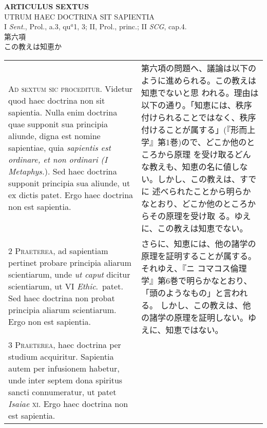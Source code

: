 \documentclass[10pt]{jsarticle}
\begin{document}
\begin{center}
 {\Large {\bf ARTICULUS SEXTUS}}\\
 {\large UTRUM HAEC DOCTRINA SIT SAPIENTIA}\\
 {\footnotesize I {\itshape Sent.}, Prol., a.3, qu$^a$1, 3; II, Prol.,
 princ.; II {\itshape SCG}, cap.4.}\\
 {\Large 第六項\\この教えは知恵か}
\end{center}

\begin{longtable}{p{21em}p{21em}}



{\Huge A}{\scshape d sextum sic proceditur}. Videtur quod haec
doctrina non sit sapientia. Nulla enim doctrina quae supponit sua
principia aliunde, digna est nomine sapientiae, quia {\itshape
sapientis est ordinare, et non ordinari (I Metaphys.}). Sed haec
doctrina supponit principia sua aliunde, ut ex dictis patet. Ergo haec
doctrina non est sapientia.


&

第六項の問題へ、議論は以下のように進められる。この教えは知恵でないと思
われる。理由は以下の通り。「知恵には、秩序付けられることではなく、秩序
付けることが属する」(『形而上学』第1巻)ので、どこか他のところから原理
を受け取るどんな教えも、知恵の名に値しない。しかし、この教えは、すでに
述べられたことから明らかなとおり、どこか他のところからその原理を受け取
る。ゆえに、この教えは知恵でない。

\\


{\scshape 2 Praeterea}, ad sapientiam pertinet probare principia
aliarum scientiarum, unde {\itshape ut caput} dicitur scientiarum, ut
VI {\itshape Ethic}.~patet. Sed haec doctrina non probat principia
aliarum scientiarum. Ergo non est sapientia.


&

さらに、知恵には、他の諸学の原理を証明することが属する。それゆえ、『ニ
コマコス倫理学』第6巻で明らかなとおり、「頭のようなもの」と言われる。
しかし、この教えは、他の諸学の原理を証明しない。ゆえに、知恵ではない。


\\


{\scshape 3 Praeterea}, haec doctrina per studium
acquiritur. Sapientia autem per infusionem habetur, unde inter septem
dona spiritus sancti connumeratur, ut patet {\itshape Isaiae}
{\scshape xi}. Ergo haec doctrina non est sapientia.



\end{longtable}
\end{document}

